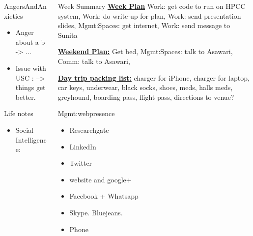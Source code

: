 \documentclass[serif, mathserif, final]{beamer}
\begin{document}
\begin{frame}
\begin{columns}
\begin{column}{0.25\linewidth}
\begin{block}{AngersAndAnxieties}
\begin{itemize}
        \item \tiny Anger about a b  -> ...
        \item \tiny Issue with USC : --> things get better. 
        \end{itemize}
      \end{block}
      \begin{block}{Life notes}
        \begin{itemize}
          \tiny \item \tiny Social Intelligence: 
        \end{itemize}
      \end{block}
    \end{column}

\begin{column}{0.5\linewidth}
  \begin{block}{Week Summary}
    {\tiny \underline{\bf Week Plan} Work: get code to run on HPCC
      system, Work: do write-up for plan, Work: send presentation
      slides,  Mgmt:Spaces: get internet, Work: send message to Sunita} 


    {\tiny \underline{\bf Weekend Plan:}} Get bed, Mgmt:Spaces: talk
    to Asawari, Comm: talk to
    Asawari, 

    {\underline{\bf Day trip packing list:} charger for iPhone,
      charger for laptop, car keys, underwear, black socks, shoes,
      meds, halls meds, greyhound, boarding pass, flight pass, directions to
      venue?}

    \begin{block}{Mgmt:webpresence}
      \begin{itemize} 
          \tiny \item \tiny Researchgate 
        \item \tiny LinkedIn 
        \item \tiny Twitter 
        \item \tiny website and google+ 
        \item \tiny Facebook + Whatsapp
        \item \tiny Skype.  Bluejeans. 
        \item \tiny Phone
        \end{itemize}
    \end{block}


\end{block}
\end{column}
\end{columns}
\end{frame}
\end{document}
